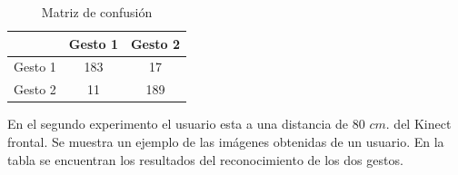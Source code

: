 \begin{table}[h!] 
\begin{center}
\begin{tabular}{ r || c | c |} 
 
        & Gesto 1 & Gesto 2 \\ \hline \hline  
Gesto 1 & 183     &  17     \\ \hline  
Gesto 2 & 11      & 189     \\   

\end{tabular}
\end{center} 
\caption{Matriz de confusión}
\end{table}


En el segundo experimento el usuario esta a una distancia de $80$ $cm.$ del Kinect frontal. Se muestra un ejemplo de las imágenes obtenidas de un usuario. En la tabla se encuentran los resultados del reconocimiento de los dos gestos.   

